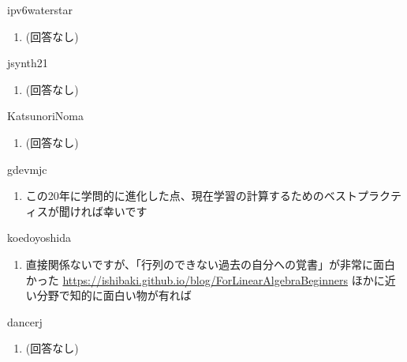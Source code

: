 \begin{prework}{ ipv6waterstar }
  \begin{enumerate}
  \item (回答なし)
  \end{enumerate}
\end{prework}

\begin{prework}{ jsynth21 }
  \begin{enumerate}
  \item (回答なし)
  \end{enumerate}
\end{prework}

\begin{prework}{ KatsunoriNoma }
  \begin{enumerate}
  \item (回答なし)
  \end{enumerate}
\end{prework}

\begin{prework}{ gdevmjc }
  \begin{enumerate}
  \item この20年に学問的に進化した点、現在学習の計算するためのベストプラクティスが聞ければ幸いです
  \end{enumerate}
\end{prework}

\begin{prework}{ koedoyoshida }
  \begin{enumerate}
  \item 直接関係ないですが、「行列のできない過去の自分への覚書」が非常に面白かった \url{https://ishibaki.github.io/blog/ForLinearAlgebraBeginners} ほかに近い分野で知的に面白い物が有れば
  \end{enumerate}
\end{prework}

\begin{prework}{ dancerj }
  \begin{enumerate}
  \item (回答なし)
  \end{enumerate}
\end{prework}
